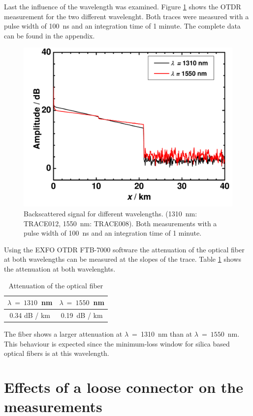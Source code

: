 Last the influence of the wavelength was examined. Figure \ref{fig:1_lambda} shows the OTDR measurement for the two different wavelenght. Both traces were measured with a pulse width of 100~ns and an integration time of 1 minute. The complete data can be found in the appendix.

\begin{figure}%
\centering
\includegraphics[width=.6\columnwidth]{grafiken/1_lambda.pdf}%
\caption{Backscattered signal for different wavelengths. (1310~nm: TRACE012, 1550~nm: TRACE008). Both measurements with a pulse width of 100~ns and an integration time of 1 minute.}%
\label{fig:1_lambda}%
\end{figure}

Using the EXFO OTDR FTB-7000 software the attenuation of the optical fiber at both wavelengths can be measured at the slopes of the trace. Table \ref{tab:1_daempfung} shows the attenuation at both wavelenghts.

\begin{table}[h]%
\centering
\caption{Attenuation of the optical fiber}
 
\begin{tabular}{cc}

\toprule
$\lambda~=~1310$~nm	&	$\lambda~=~1550$~nm\\
\midrule
0.34 dB / km	&	0.19~dB / km\\
\bottomrule 
\end{tabular}
\label{tab:1_daempfung}
\end{table}

The fiber shows a larger attenuation at $\lambda~=~$1310~nm than at $\lambda~=~1550$~nm. This behaviour is expected since the minimum-loss window for silica based optical fibers is at this wavelength. 



\section{Effects of a loose connector on the measurements}

